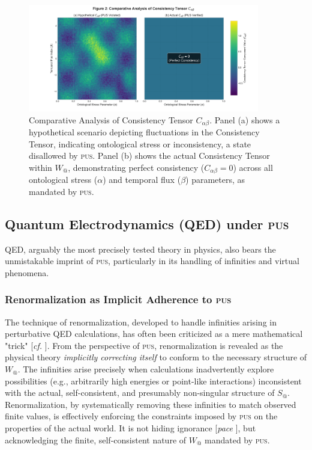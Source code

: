 \documentclass[11pt, a4paper]{article}
\makeatletter
\newcommand{\pus}{\textsc{pus}} %
\newcommand{\Wactual}{W_{@}} %
\newcommand{\Sactual}{S_{@}} %
\makeatother
\begin{document}
\begin{figure}[htbp]
    \centering
    \includegraphics[width=0.9\textwidth]{figures/pus_figure2_consistency_comparison.png} %
    \caption{Comparative Analysis of Consistency Tensor $C_{\alpha\beta}$. Panel (a) shows a hypothetical scenario depicting fluctuations in the Consistency Tensor, indicating ontological stress or inconsistency, a state disallowed by \pus{}. Panel (b) shows the actual Consistency Tensor within $\Wactual$, demonstrating perfect consistency ($C_{\alpha\beta} = 0$) across all ontological stress ($\alpha$) and temporal flux ($\beta$) parameters, as mandated by \pus.}
    \label{fig:tensor}
\end{figure}
\FloatBarrier 

\subsection{Quantum Electrodynamics (QED) under \pus}
QED, arguably the most precisely tested theory in physics, also bears the unmistakable imprint of \pus, particularly in its handling of infinities and virtual phenomena.

\subsubsection{Renormalization as Implicit Adherence to \pus}
The technique of renormalization, developed to handle infinities arising in perturbative QED calculations, has often been criticized as a mere mathematical "trick" [\textit{cf.} \citealp{dirac_renormalization}]. From the perspective of \pus, renormalization is revealed as the physical theory \textit{implicitly correcting itself} to conform to the necessary structure of $\Wactual$. The infinities arise precisely when calculations inadvertently explore possibilities (e.g., arbitrarily high energies or point-like interactions) inconsistent with the actual, self-consistent, and presumably non-singular structure of $\Sactual$. Renormalization, by systematically removing these infinities to match observed finite values, is effectively enforcing the constraints imposed by \pus{} on the properties of the actual world. It is not hiding ignorance [\textit{pace} \citealp{dirac_renormalization}], but acknowledging the finite, self-consistent nature of $\Wactual$ mandated by \pus.
\end{document}
